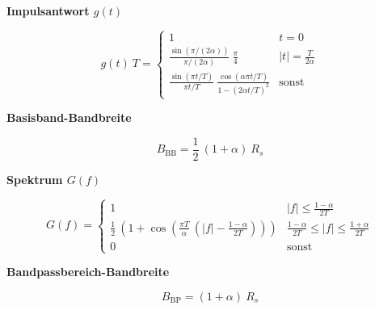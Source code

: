 \documentclass[a4paper, 11pt]{article}
\newcommand{\fancyformula}[2]{
        \small
        \raggedright{\sffamily\textbf{#1}}
        #2
}
\begin{document}
\begin{multicols}{2}
	\fancyformula{Impulsantwort $g(t)$}{
		\[
			g(t) ~ T= \begin{cases}
				1 & t = 0 \\
				\frac{\sin(\pi / (2 \alpha))}{\pi / (2 \alpha)} ~ \frac{\pi}{4} & |t| = \frac{T}{2 \alpha} \\
				\frac{\sin(\pi t / T)}{\pi t / T} ~ \frac{\cos(\alpha \pi t / T)}{1 - (2 \alpha t / T)^2} & \text{sonst}
			\end{cases}
		\]
	}

	\fancyformula{Basisband-Bandbreite}{
		\[
			B_{\mathrm{BB}} = \frac{1}{2} ~ (1 + \alpha) ~ R_s
		\]
	}

	\fancyformula{Spektrum $G(f)$}{
		\[
			G(f) = \begin{cases}
				1 & |f| \leq \frac{1 - \alpha}{2T} \\
				\frac{1}{2} ~ \left(1 + \cos \left(\frac{\pi T}{\alpha} ~ (|f| - \frac{1 - \alpha}{2 T}) \right) \right) & \frac{1 - \alpha}{2 T} \leq |f| \leq \frac{1 + \alpha}{2 T} \\
				0 & \text{sonst}
			\end{cases}
		\]
	}

	\fancyformula{Bandpassbereich-Bandbreite}{
		\[
			B_{\mathrm{BP}} = (1 + \alpha) ~ R_s
		\]
	}
\end{multicols}

\end{document}
